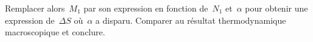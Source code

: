 \documentclass[utf8, 11pt]{feuille}
\begin{document}
\question
Remplacer alors~$M_1$ par son expression en fonction de~$N_1$
et~$\alpha$ pour obtenir une expression de~$\Delta S$ où~$\alpha$ a
disparu. Comparer au résultat thermodynamique macroscopique et conclure.
\end{document}
